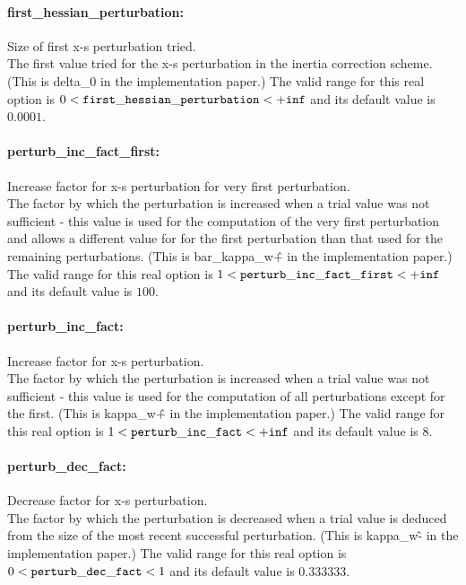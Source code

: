 \paragraph{first\_hessian\_perturbation:}\label{sec:first_hessian_perturbation} Size of first x-s perturbation tried. $\;$ \\
 The first value tried for the x-s perturbation in
the inertia correction scheme.(This is delta\_0
in the implementation paper.) The valid range for this real option is 
$0 <  {\tt first\_hessian\_perturbation } <  {\tt +inf}$
and its default value is $0.0001$.


\paragraph{perturb\_inc\_fact\_first:}\label{sec:perturb_inc_fact_first} Increase factor for x-s perturbation for very first perturbation. $\;$ \\
 The factor by which the perturbation is increased
when a trial value was not sufficient - this
value is used for the computation of the very
first perturbation and allows a different value
for for the first perturbation than that used for
the remaining perturbations. (This is
bar\_kappa\_w\^+ in the implementation paper.) The valid range for this real option is 
$1 <  {\tt perturb\_inc\_fact\_first } <  {\tt +inf}$
and its default value is $100$.


\paragraph{perturb\_inc\_fact:}\label{sec:perturb_inc_fact} Increase factor for x-s perturbation. $\;$ \\
 The factor by which the perturbation is increased
when a trial value was not sufficient - this
value is used for the computation of all
perturbations except for the first. (This is
kappa\_w\^+ in the implementation paper.) The valid range for this real option is 
$1 <  {\tt perturb\_inc\_fact } <  {\tt +inf}$
and its default value is $8$.


\paragraph{perturb\_dec\_fact:}\label{sec:perturb_dec_fact} Decrease factor for x-s perturbation. $\;$ \\
 The factor by which the perturbation is decreased
when a trial value is deduced from the size of
the most recent successful perturbation. (This is
kappa\_w\^- in the implementation paper.) The valid range for this real option is 
$0 <  {\tt perturb\_dec\_fact } <  1$
and its default value is $0.333333$.


